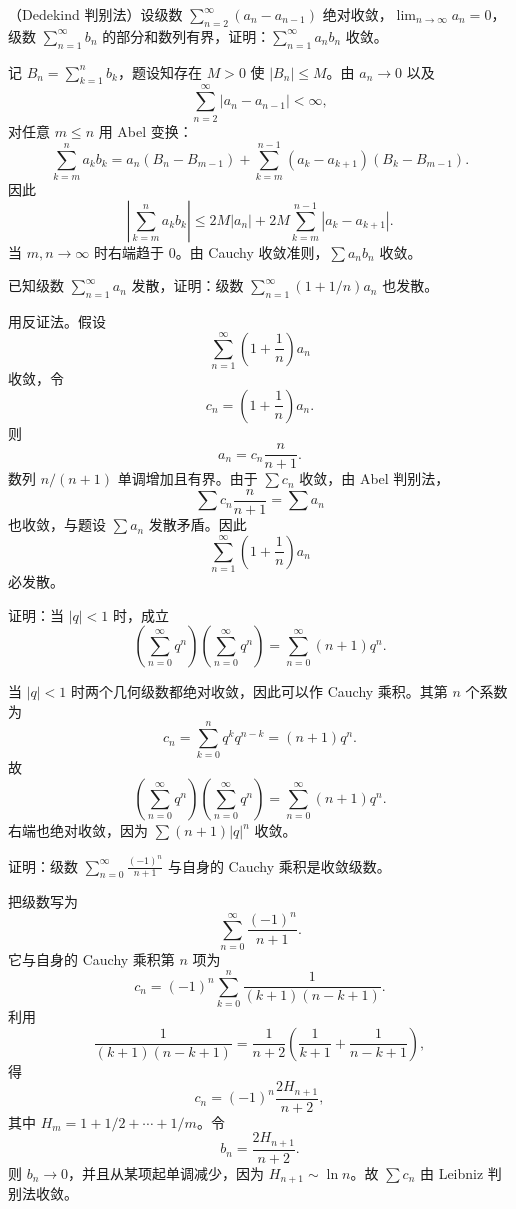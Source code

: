 \begin{xexercise}[9]
（Dedekind 判别法）设级数 $\sum_{n=2}^{\infty}(a_n-a_{n-1})$ 绝对收敛，$\lim_{n\to\infty}a_n=0$，级数 $\sum_{n=1}^{\infty}b_n$ 的部分和数列有界，证明：$\sum_{n=1}^{\infty}a_nb_n$ 收敛。
\end{xexercise}
\begin{xsolution}
记 $B_n=\sum_{k=1}^{n}b_k$，题设知存在 $M>0$ 使 $|B_n|\leq M$。由 $a_n\to0$ 以及
\[
 \sum_{n=2}^{\infty}|a_n-a_{n-1}|<\infty,
\]
对任意 $m\leq n$ 用 Abel 变换：
\[
 \sum_{k=m}^{n}a_kb_k
 =a_n(B_n-B_{m-1})
 +\sum_{k=m}^{n-1}(a_k-a_{k+1})(B_k-B_{m-1}).
\]
因此
\[
 \left|\sum_{k=m}^{n}a_kb_k\right|
 \leq2M|a_n|+2M\sum_{k=m}^{n-1}|a_k-a_{k+1}|.
\]
当 $m,n\to\infty$ 时右端趋于 $0$。由 Cauchy 收敛准则，$\sum a_nb_n$ 收敛。
\end{xsolution}


\begin{xexercise}[10]
已知级数 $\sum_{n=1}^{\infty}a_n$ 发散，证明：级数 $\sum_{n=1}^{\infty}(1+1/n)a_n$ 也发散。
\end{xexercise}
\begin{xsolution}
用反证法。假设
\[
 \sum_{n=1}^{\infty}\left(1+\frac1n\right)a_n
\]
收敛，令
\[
 c_n=\left(1+\frac1n\right)a_n.
\]
则
\[
 a_n=c_n\frac{n}{n+1}.
\]
数列 $n/(n+1)$ 单调增加且有界。由于 $\sum c_n$ 收敛，由 Abel 判别法，
\[
 \sum c_n\frac{n}{n+1}=\sum a_n
\]
也收敛，与题设 $\sum a_n$ 发散矛盾。因此
\[
 \sum_{n=1}^{\infty}\left(1+\frac1n\right)a_n
\]
必发散。
\end{xsolution}


\begin{xexercise}[11]
证明：当 $|q|<1$ 时，成立
\[
\left(\sum_{n=0}^{\infty}q^n\right)\left(\sum_{n=0}^{\infty}q^n\right)=\sum_{n=0}^{\infty}(n+1)q^n.
\]
\end{xexercise}
\begin{xsolution}
当 $|q|<1$ 时两个几何级数都绝对收敛，因此可以作 Cauchy 乘积。其第 $n$ 个系数为
\[
 c_n=\sum_{k=0}^{n}q^kq^{n-k}=(n+1)q^n.
\]
故
\[
 \left(\sum_{n=0}^{\infty}q^n\right)
 \left(\sum_{n=0}^{\infty}q^n\right)
 =\sum_{n=0}^{\infty}(n+1)q^n.
\]
右端也绝对收敛，因为 $\sum(n+1)|q|^n$ 收敛。
\end{xsolution}


\begin{xexercise}[12]
证明：级数 $\sum_{n=0}^{\infty}\frac{(-1)^n}{n+1}$ 与自身的 Cauchy 乘积是收敛级数。
\end{xexercise}
\begin{xsolution}
把级数写为
\[
 \sum_{n=0}^{\infty}\frac{(-1)^n}{n+1}.
\]
它与自身的 Cauchy 乘积第 $n$ 项为
\[
 c_n=(-1)^n\sum_{k=0}^{n}\frac1{(k+1)(n-k+1)}.
\]
利用
\[
 \frac1{(k+1)(n-k+1)}
 =\frac1{n+2}\left(\frac1{k+1}+\frac1{n-k+1}\right),
\]
得
\[
 c_n=(-1)^n\frac{2H_{n+1}}{n+2},
\]
其中 $H_m=1+1/2+\cdots+1/m$。令
\[
 b_n=\frac{2H_{n+1}}{n+2}.
\]
则 $b_n\to0$，并且从某项起单调减少，因为 $H_{n+1}\sim\ln n$。故 $\sum c_n$ 由 Leibniz 判别法收敛。
\end{xsolution}


